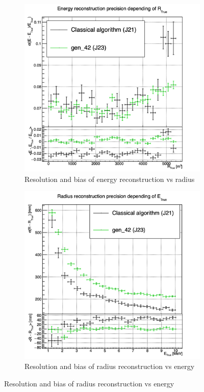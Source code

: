 \documentclass[../main.tex]{subfiles}
\begin{document}
\begin{figure}[ht]
\begin{subfigure}[t]{0.32\linewidth}
    \includegraphics[width=\linewidth]{images/jcnn/vic_cnn/multi_vic_42_MESBvRTC.png}
    \caption{Resolution and bias of energy reconstruction vs radius}
    \label{fig:jcnn:vic_cnn:multi_vic_42_MESBvRTC}
  \end{subfigure}
  \begin{subfigure}[t]{0.32\linewidth}
    \centering
    \includegraphics[width=\linewidth]{images/jcnn/vic_cnn/multi_vic_42_MSBvETC.png}
    \caption{Resolution and bias of radius reconstruction vs energy}
    \label{fig:jcnn:vic_cnn:multi_vic_42_MSBvETC}
  \end{subfigure}



\end{figure}
\end{document}
